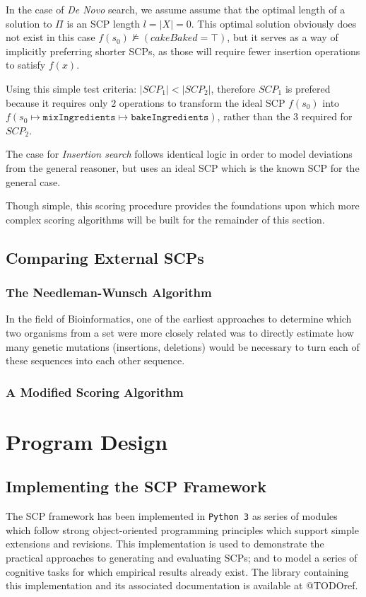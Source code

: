 \documentclass[
11pt, %
english, %
singlespacing, %
headsepline, %
]{MastersDoctoralThesis} %
\begin{document}
In the case of \textit{De Novo} search, we assume assume that the optimal length of a solution to $\Pi$ is an SCP length $l=|X|=0$. This optimal solution obviously does not exist in this case $f(s_0) \not\models (cakeBaked = \top)$, but it serves as a way of implicitly preferring shorter SCPs, as those will require fewer insertion operations to satisfy $f(x)$. 

Using this simple test criteria: $|SCP_1| < |SCP_2|$, therefore $SCP_1$ is prefered because it requires only $2$ operations to transform the ideal SCP $f(s_0)$ into $f(s_0\longmapsto \texttt{mixIngredients} \longmapsto \texttt{bakeIngredients})$, rather than the $3$ required for $SCP_2$.

The case for \textit{Insertion search} follows identical logic in order to model deviations from the general reasoner, but uses an ideal SCP which is the known SCP for the general case.

Though simple, this scoring procedure provides the foundations upon which more complex scoring algorithms will be built for the remainder of this section.

\section{Comparing External SCPs} \label{ssec:compExt}
\subsection{The Needleman-Wunsch Algorithm} \label{ssec:nw}
In the field of Bioinformatics, one of the earliest approaches to determine which two organisms from a set were more closely related was to directly estimate how many genetic mutations (insertions, deletions) would be necessary to turn each of these sequences into each other sequence.

\subsection{A Modified Scoring Algorithm} \label{ssec:nw_mod}


\chapter{Program Design}
\section{Implementing the SCP Framework}
The SCP framework has been implemented in \texttt{Python 3} as series of modules which follow strong object-oriented programming principles which support simple extensions and revisions. This implementation is used to demonstrate the practical approaches to generating and evaluating SCPs; and to model a series of cognitive tasks for which empirical results already exist. The library containing this implementation and its associated documentation is available at @TODOref.
\end{document}
